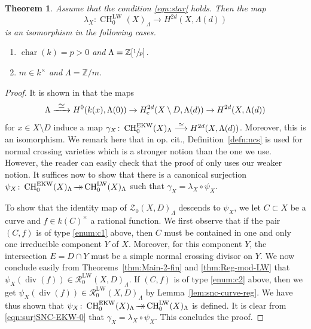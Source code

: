 \documentclass[JEP,XML,SOM,Unicode,published]{cedram}
\let\mathcal\mathscr
\newcommand{\onto}{\mathchoice{\to\hspace*{-5mm}\to}{\hspace*{-.5mm}\to\hspace*{-2.85mm}\to\hspace*{-.5mm}}{\to\hspace*{-3mm}\to}{\to\hspace*{-3mm}\to}}
\def\To#1{\mathchoice{\xrightarrow{\textstyle\kern4pt#1\kern3pt}}{\stackrel{#1}{\longrightarrow}}{}{}}
\let\surj\onto
\newcommand{\rc}{\mathrm{c}}
\newcommand{\EKW}{\mathrm{EKW}}
\newcommand{\LW}{\mathrm{LW}}
\newtheorem{thm}{Theorem}[section]
\theoremstyle{definition}
\newcommand{\lemref}{Lemma~\ref}
\newcommand{\defref}{Definition~\ref}
\newcommand{\sR}{{\mathcal R}}
\newcommand{\sZ}{{\mathcal Z}}
\newcommand{\Z}{{\mathbb Z}}
\DeclareMathOperator{\CH}{CH}
\DeclareMathOperator{\Char}{char}
\DeclareMathOperator{\divf}{div}
\begin{document}
\begin{thm}\label{thm:EKW-LW}
Assume that the condition \eqref{eqn:star} holds.
Then the map
\[
\lambda_X \colon \CH^{\LW}_0(X)_\Lambda \to H^{2d}(X, \Lambda(d))
\]
is an isomorphism in the following cases.
\begin{enumerate}
\item\label{thm:EKW-LW1}
$\Char(k) = p > 0$ and $\Lambda =
\Z[\sfrac{1}{p}]$.
\item\label{thm:EKW-LW2}
$m \in k^{\times}$ and $\Lambda = {\Z}/m$.
\end{enumerate}
\end{thm}
\begin{proof}
It is shown in \cite[Th.\,7.1]{EKW} that the maps
\begin{equation}\label{eqn:surjSNC-EKW-0}
\Lambda \To{\simeq} H^0(k(x), \Lambda(0)) \to
H^{2d}_\rc(X \setminus D, \Lambda(d)) \to H^{2d}(X, \Lambda(d))
\end{equation}
for $x \in X \setminus D$ induce a map
$\gamma_X \colon \CH^{\EKW}_0(X)_\Lambda \To{\simeq}
H^{2d}(X, \Lambda(d))$. Moreover, this is an isomorphism.
We remark here that in op. cit., \defref{defn:ncs} is used for
normal crossing varieties which is a stronger notion than the one we use.
However, the reader can easily check that the proof of \cite[Th.\,7.1]{EKW}
only uses our weaker notion. It suffices now to show that
there is a canonical surjection $\psi_X\colon \CH^{\EKW}_0(X)_\Lambda \surj
\CH^{\LW}_0(X)_\Lambda$ such that $\gamma_X = \lambda_X \circ \psi_X$.

To show that the identity map of $\sZ_0(X, D)_\Lambda$ descends to $\psi_X$,
we let $C \subset X$ be a curve and $f \in k(C)^{\times}$ a rational function.
We first observe that if the pair $(C,f)$ is of type \eqref{enum:c1} above, then
$C$ must be contained in
one and only one irreducible component $Y$ of $X$. Moreover, for
this component $Y$, the intersection \hbox{$E = D \cap Y$} must be a simple normal
crossing divisor on $Y$. We now conclude easily from Theorems~\ref{thm:Main-2-fin}
and \ref{thm:Reg-mod-LW} that $\psi_{X}(\divf(f)) \in \sR^{\LW}_0(X,D)_\Lambda$.
If $(C,f)$ is of type \eqref{enum:c2} above, then we get
$\psi_X(\divf(f)) \in \sR^{\LW}_0(X,D)_\Lambda$
by \lemref{lem:snc-curve-reg}. We have thus shown that $\psi_X \colon
\CH^{\EKW}_0(X)_\Lambda \surj \CH^{\LW}_0(X)_\Lambda$ is defined.
It is clear from \eqref{eqn:surjSNC-EKW-0} that
$\gamma_X = \lambda_X \circ \psi_X$.
This concludes the proof.
\end{proof}

\backmatter


\end{document}
